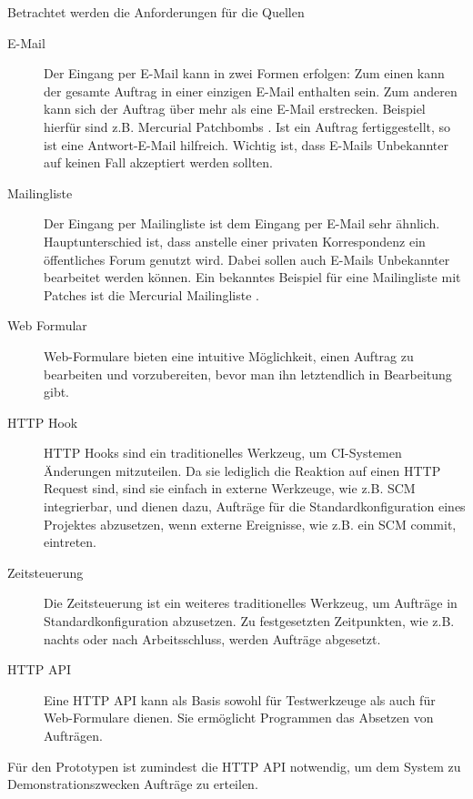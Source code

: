 Betrachtet werden die Anforderungen für die Quellen
\begin{description}
    \item[E-Mail]
        Der Eingang per E-Mail kann in zwei Formen erfolgen:
        Zum einen kann der gesamte Auftrag in einer einzigen E-Mail enthalten sein.
        Zum anderen kann sich der Auftrag über mehr als eine E-Mail erstrecken.
        Beispiel hierfür sind z.B. Mercurial Patchbombs \cite{mercurial:patchbomb}.
        Ist ein Auftrag fertiggestellt, so ist eine Antwort-E-Mail hilfreich.
        Wichtig ist, dass E-Mails Unbekannter auf keinen Fall
        akzeptiert werden sollten.
    \item[Mailingliste]
        Der Eingang per Mailingliste ist dem Eingang per E-Mail sehr ähnlich.
        Hauptunterschied ist, dass anstelle einer privaten Korrespondenz
        ein öffentliches Forum genutzt wird. Dabei sollen auch E-Mails Unbekannter 
        bearbeitet werden können.
        Ein bekanntes Beispiel für eine Mailingliste mit Patches
        ist die Mercurial Mailingliste \cite{mercurial:mailingliste}.
    \item[Web Formular]
        Web-Formulare bieten eine intuitive Möglichkeit,
        einen Auftrag zu bearbeiten und vorzubereiten,
        bevor man ihn letztendlich in Bearbeitung gibt.
    \item[HTTP Hook]
        HTTP Hooks sind ein traditionelles Werkzeug,
        um \ac{CI}-Systemen Änderungen mitzuteilen.
        Da sie lediglich die Reaktion auf einen HTTP Request sind,
        sind sie einfach in externe Werkzeuge, wie z.B. \ac{SCM} integrierbar,
        und dienen dazu, Aufträge für die Standardkonfiguration
        eines Projektes abzusetzen, wenn externe Ereignisse,
        wie z.B. ein SCM commit, eintreten.
    \item[Zeitsteuerung]
        Die Zeitsteuerung ist ein weiteres traditionelles Werkzeug,
        um Aufträge in Standardkonfiguration abzusetzen.
        Zu festgesetzten Zeitpunkten, wie z.B. nachts oder nach
        Arbeitsschluss, werden Aufträge abgesetzt.
    \item[HTTP API]
        Eine HTTP API kann als Basis sowohl für Testwerkzeuge
        als auch für Web-Formulare dienen.
        Sie ermöglicht Programmen das Absetzen von Aufträgen.
\end{description}

Für den Prototypen ist zumindest die HTTP API notwendig,
um dem System zu Demonstrationszwecken Aufträge zu erteilen.


